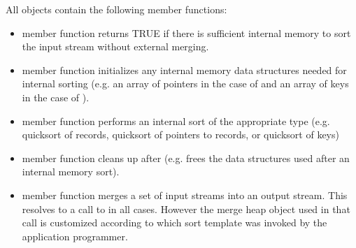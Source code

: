All  objects contain the following
member functions:
\begin{itemize}
    \item member function 
    returns TRUE if there is sufficient internal memory to
    sort the input stream without external merging.

    \item member function 
    initializes any internal memory data structures needed
    for internal sorting (e.g. an array of pointers in the
    case of  and an array of keys in the
    case
    of ).

    \item member function  performs
    an internal sort of the appropriate type (e.g. quicksort
    of records, quicksort of pointers to records, or
    quicksort of keys)

    \item member function 
    cleans up after  (e.g. frees the
    data structures used after an internal memory sort).

    \item member function  merges a set
    of input streams into an output stream. This resolves
    to a call to  in all
    cases. However the merge heap object used in that call
    is customized according to which sort template was
    invoked by
    the application programmer.

\end{itemize}

